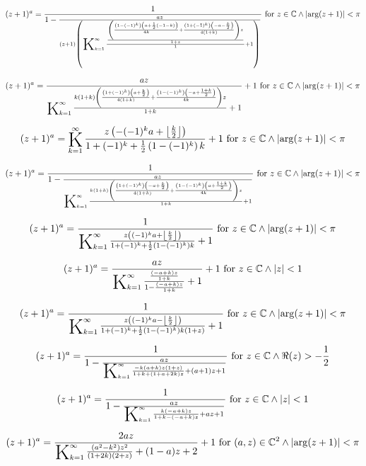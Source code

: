 \documentclass{article}
\newcommand{\bigK}{\mathop{\raisebox{-5pt}{\huge K}}}
\begin{document}
\[(z+1)^a=\frac{1}{1-\frac{a z}{(z+1) \left(\bigK_{k=1}^{\infty}\frac{\frac{\left(\frac{\left(1-(-1)^k\right) \left(a+\frac{1}{2} (-1-k)\right)}{4 k}+\frac{\left(1+(-1)^k\right) \left(-a-\frac{k}{2}\right)}{4 (1+k)}\right) z}{1+z}}{1}+1\right)}}\text{ for }z\in \mathbb{C}\land \left| \arg (z+1)\right| <\pi\] 

\[(z+1)^a=\frac{a z}{\bigK_{k=1}^{\infty}\frac{k (1+k) \left(\frac{\left(1+(-1)^k\right) \left(a+\frac{k}{2}\right)}{4 (1+k)}+\frac{\left(1-(-1)^k\right) \left(-a+\frac{1+k}{2}\right)}{4 k}\right) z}{1+k}+1}+1\text{ for }z\in \mathbb{C}\land \left| \arg (z+1)\right| <\pi\] 

\[(z+1)^a=\bigK_{k=1}^{\infty}\frac{z \left(-(-1)^k a+\left\lfloor \frac{k}{2}\right\rfloor \right)}{1+(-1)^k+\frac{1}{2} \left(1-(-1)^k\right) k}+1\text{ for }z\in \mathbb{C}\land \left| \arg (z+1)\right| <\pi\] 

\[(z+1)^a=\frac{1}{1-\frac{a z}{\bigK_{k=1}^{\infty}\frac{k (1+k) \left(\frac{\left(1+(-1)^k\right) \left(-a+\frac{k}{2}\right)}{4 (1+k)}+\frac{\left(1-(-1)^k\right) \left(a+\frac{1+k}{2}\right)}{4 k}\right) z}{1+k}+1}}\text{ for }z\in \mathbb{C}\land \left| \arg (z+1)\right| <\pi\] 

\[(z+1)^a=\frac{1}{\bigK_{k=1}^{\infty}\frac{z \left((-1)^k a+\left\lfloor \frac{k}{2}\right\rfloor \right)}{1+(-1)^k+\frac{1}{2} \left(1-(-1)^k\right) k}+1}\text{ for }z\in \mathbb{C}\land \left| \arg (z+1)\right| <\pi\] 

\[(z+1)^a=\frac{a z}{\bigK_{k=1}^{\infty}\frac{\frac{(-a+k) z}{1+k}}{1-\frac{(-a+k) z}{1+k}}+1}+1\text{ for }z\in \mathbb{C}\land \left| z\right| <1\] 

\[(z+1)^a=\frac{1}{\bigK_{k=1}^{\infty}\frac{z \left((-1)^k a-\left\lfloor \frac{k}{2}\right\rfloor \right)}{1+(-1)^k+\frac{1}{2} \left(1-(-1)^k\right) k (1+z)}+1}\text{ for }z\in \mathbb{C}\land \left| \arg (z+1)\right| <\pi\] 

\[(z+1)^a=\frac{1}{1-\frac{a z}{\bigK_{k=1}^{\infty}\frac{-k (a+k) z (1+z)}{1+k+(1+a+2 k) z}+(a+1) z+1}}\text{ for }z\in \mathbb{C}\land \Re(z)>-\frac{1}{2}\] 

\[(z+1)^a=\frac{1}{1-\frac{a z}{\bigK_{k=1}^{\infty}\frac{k (-a+k) z}{1+k-(-a+k) z}+a z+1}}\text{ for }z\in \mathbb{C}\land \left| z\right| <1\] 

\[(z+1)^a=\frac{2 a z}{\bigK_{k=1}^{\infty}\frac{\left(a^2-k^2\right) z^2}{(1+2 k) (2+z)}+(1-a) z+2}+1\text{ for }(a,z)\in \mathbb{C}^2\land \left| \arg (z+1)\right| <\pi\] 
\end{document}
